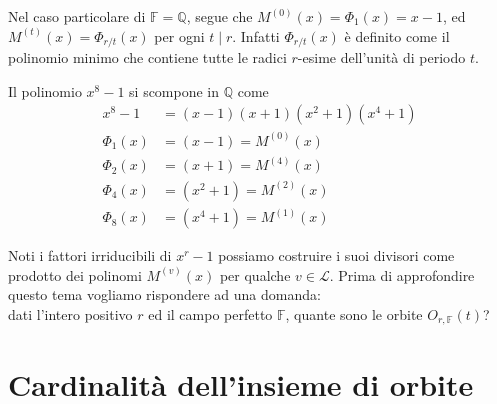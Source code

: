 \begin{osservazione}
   Nel caso particolare di $\mathbb{F} = \mathbb{Q}$, segue che $M^{(0)}(x) = \Phi_{1}(x) = x-1$, ed $M^{(t)}(x) = \Phi_{r/t}(x)$ per ogni $t\mid r$. Infatti $\Phi_{r/t}(x)$ è definito come il polinomio minimo che contiene tutte le radici $r$-esime dell'unità di periodo $t$. 
\end{osservazione}
\begin{esempio}
   Il polinomio $x^8 - 1$ si scompone in $\mathbb{Q}$ come
   \begin{align*}
      x^8 - 1 &= (x-1)(x+1)(x^2 + 1) (x^4+1)\\  
      \Phi_{1}(x) &= (x-1)  = M^{(0)}(x) \\
      \Phi_{2}(x) &= (x+1)= M^{(4)}(x)  \\
      \Phi_{4}(x) &= (x^2 + 1) = M^{(2)}(x) \\
      \Phi_{8}(x) &= (x^4 + 1)  = M^{(1)}(x)
   \end{align*}
\end{esempio}
\noindent
Noti i fattori irriducibili di $x^r-1$ possiamo costruire i suoi divisori come prodotto dei polinomi $M^{(v)}(x)$ per qualche $v \in \mathscr{L}$.
Prima di approfondire questo tema vogliamo rispondere ad una domanda: \\
dati l'intero positivo $r$ ed il campo perfetto $\mathbb{F}$, quante sono le orbite $O_{r,\mathbb{F}}(t)$?


\section{Cardinalità dell'insieme di orbite}

